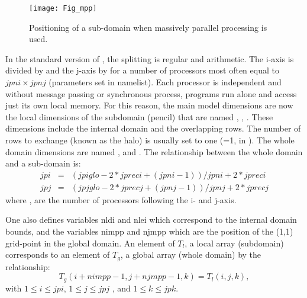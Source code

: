 \documentclass[NEMO_book]{subfiles}
\begin{document}
\begin{figure}[!t]    \begin{center}
\texttt{[image: Fig\_mpp]}
\caption{   \label{Fig_mpp} 
Positioning of a sub-domain when massively parallel processing is used. }
\end{center}   \end{figure}

In the standard version of \NEMO, the splitting is regular and arithmetic.
The i-axis is divided by  and the j-axis by  for a number of processors 
 most often equal to $jpni \times jpnj$ (parameters set in 
  namelist). Each processor is independent and without message passing 
 or synchronous process, programs run alone and access just its own local memory. 
 For this reason, the main model dimensions are now the local dimensions of the subdomain (pencil) 
 that are named , , . These dimensions include the internal 
 domain and the overlapping rows. The number of rows to exchange (known as 
 the halo) is usually set to one (=1, in ). The whole domain 
 dimensions are named ,  and . The relationship between 
 the whole domain and a sub-domain is:
\begin{eqnarray} 
      jpi & = & ( jpiglo-2*jpreci + (jpni-1) ) / jpni + 2*jpreci  \nonumber \\
      jpj & = & ( jpjglo-2*jprecj + (jpnj-1) ) / jpnj + 2*jprecj  \label{Eq_lbc_jpi}
\end{eqnarray}
where ,  are the number of processors following the i- and j-axis.

One also defines variables nldi and nlei which correspond to the internal domain bounds, 
and the variables nimpp and njmpp which are the position of the (1,1) grid-point in the global domain. 
An element of $T_{l}$, a local array (subdomain) corresponds to an element of $T_{g}$, 
a global array (whole domain) by the relationship: 
\begin{equation} \label{Eq_lbc_nimpp}
T_{g} (i+nimpp-1,j+njmpp-1,k) = T_{l} (i,j,k),
\end{equation}
with  $1 \leq i \leq jpi$, $1  \leq j \leq jpj $ , and  $1  \leq k \leq jpk$.
\end{document}
